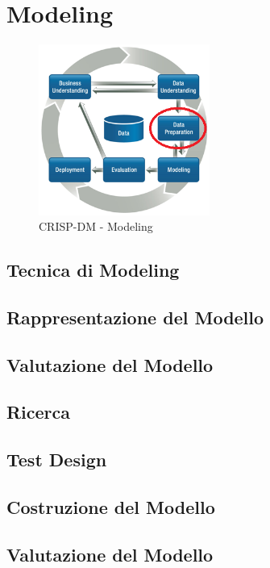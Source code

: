 \chapter{Modeling}

\begin{figure}[hbtp]
	\centering
	\includegraphics[width=0.5\textwidth]{./images/CRISPDM_3.png}
	\caption{CRISP-DM - Modeling}
	\label{CRISPDM_4}
\end{figure}

\section{Tecnica di Modeling}

\section{Rappresentazione del Modello}

\section{Valutazione del Modello}

\section{Ricerca}

\section{Test Design}

\section{Costruzione del Modello}

\section{Valutazione del Modello}

